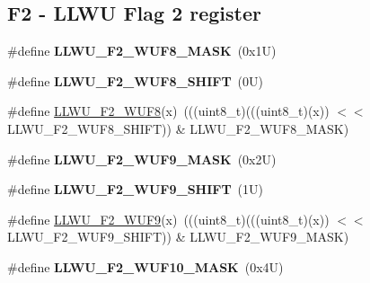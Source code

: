 \subsection*{F2 -\/ L\+L\+WU Flag 2 register}
\begin{DoxyCompactItemize}
\item 
\mbox{\label{group___l_l_w_u___register___masks_ga76228bf3593a9417e43e509166c07fad}} 
\#define {\bfseries L\+L\+W\+U\+\_\+\+F2\+\_\+\+W\+U\+F8\+\_\+\+M\+A\+SK}~(0x1\+U)
\item 
\mbox{\label{group___l_l_w_u___register___masks_ga88963ab5583725d163689b615ce5a638}} 
\#define {\bfseries L\+L\+W\+U\+\_\+\+F2\+\_\+\+W\+U\+F8\+\_\+\+S\+H\+I\+FT}~(0\+U)
\item 
\#define \mbox{\hyperlink{group___l_l_w_u___register___masks_gab1a2b83044edbc6852ae049d8afdfbdd}{L\+L\+W\+U\+\_\+\+F2\+\_\+\+W\+U\+F8}}(x)~(((uint8\+\_\+t)(((uint8\+\_\+t)(x)) $<$$<$ L\+L\+W\+U\+\_\+\+F2\+\_\+\+W\+U\+F8\+\_\+\+S\+H\+I\+FT)) \& L\+L\+W\+U\+\_\+\+F2\+\_\+\+W\+U\+F8\+\_\+\+M\+A\+SK)
\item 
\mbox{\label{group___l_l_w_u___register___masks_ga28d89e3d08f5a7db6ffbe56e9e35d771}} 
\#define {\bfseries L\+L\+W\+U\+\_\+\+F2\+\_\+\+W\+U\+F9\+\_\+\+M\+A\+SK}~(0x2\+U)
\item 
\mbox{\label{group___l_l_w_u___register___masks_gabc3e93b75e1e8e95f392b59b5dbf6edf}} 
\#define {\bfseries L\+L\+W\+U\+\_\+\+F2\+\_\+\+W\+U\+F9\+\_\+\+S\+H\+I\+FT}~(1\+U)
\item 
\#define \mbox{\hyperlink{group___l_l_w_u___register___masks_ga5bf58a8c2a31c1ee83569d2cf4896d86}{L\+L\+W\+U\+\_\+\+F2\+\_\+\+W\+U\+F9}}(x)~(((uint8\+\_\+t)(((uint8\+\_\+t)(x)) $<$$<$ L\+L\+W\+U\+\_\+\+F2\+\_\+\+W\+U\+F9\+\_\+\+S\+H\+I\+FT)) \& L\+L\+W\+U\+\_\+\+F2\+\_\+\+W\+U\+F9\+\_\+\+M\+A\+SK)
\item 
\mbox{\label{group___l_l_w_u___register___masks_gae005607b6cb3ebf1a7def97cd8b2abc5}} 
\#define {\bfseries L\+L\+W\+U\+\_\+\+F2\+\_\+\+W\+U\+F10\+\_\+\+M\+A\+SK}~(0x4\+U)
\item 
\mbox{\label{group___l_l_w_u___register___masks_ga0ac579128aa08740377c46fd52be2bb5}} 

\end{DoxyCompactItemize}
